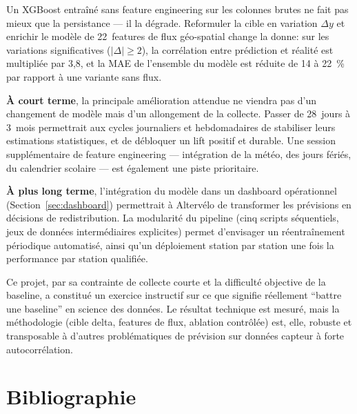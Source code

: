 \documentclass[fleqn, 12pt]{scrartcl}
\newcommand{\ent}{Altervélo}
\begin{document}
\vspace{0.3cm}

Un XGBoost entraîné sans feature engineering sur les colonnes brutes ne fait pas mieux que la persistance --- il la dégrade. Reformuler la cible en variation $\Delta y$ et enrichir le modèle de 22~features de flux géo-spatial change la donne: sur les variations significatives ($|\Delta| \geq 2$), la corrélation entre prédiction et réalité est multipliée par 3{,}8, et la MAE de l'ensemble du modèle est réduite de 14 à 22~\% par rapport à une variante sans flux.

\vspace{0.3cm}

\textbf{À court terme}, la principale amélioration attendue ne viendra pas d'un changement de modèle mais d'un allongement de la collecte. Passer de 28~jours à 3~mois permettrait aux cycles journaliers et hebdomadaires de stabiliser leurs estimations statistiques, et de débloquer un lift positif et durable. Une session supplémentaire de feature engineering --- intégration de la météo, des jours fériés, du calendrier scolaire --- est également une piste prioritaire.

\vspace{0.3cm}

\textbf{À plus long terme}, l'intégration du modèle dans un dashboard opérationnel (Section~\ref{sec:dashboard}) permettrait à \ent{} de transformer les prévisions en décisions de redistribution. La modularité du pipeline (cinq scripts séquentiels, jeux de données intermédiaires explicites) permet d'envisager un réentraînement périodique automatisé, ainsi qu'un déploiement station par station une fois la performance par station qualifiée.

\vspace{0.5cm}

Ce projet, par sa contrainte de collecte courte et la difficulté objective de la baseline, a constitué un exercice instructif sur ce que signifie réellement ``battre une baseline'' en science des données. Le résultat technique est mesuré, mais la méthodologie (cible delta, features de flux, ablation contrôlée) est, elle, robuste et transposable à d'autres problématiques de prévision sur données capteur à forte autocorrélation.



\newpage

\section[Bibliographie]{Bibliographie}%
\label{sec:biblio}



\end{document}
